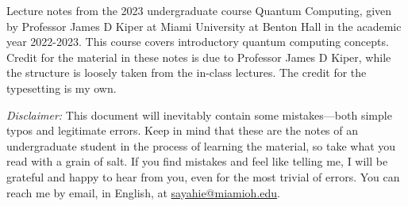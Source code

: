 Lecture notes from the 2023 undergraduate course Quantum Computing, given by Professor James D Kiper at Miami University at Benton Hall in the academic year 2022-2023. This course covers introductory quantum computing concepts. Credit for the material in these notes is due to Professor James D Kiper, while the structure is loosely taken from the in-class lectures. The credit for the typesetting is my own.

\textit{Disclaimer:} This document will inevitably contain some mistakes---both simple typos and legitimate errors. Keep in mind that these are the notes of an undergraduate student in the process of learning the material, so take what you read with a grain of salt. If you find mistakes and feel like telling me, I will be grateful and happy to hear from you, even for the most trivial of errors. You can reach me by email, in English, at \href{mailto:sayahie@miamioh.edu}{sayahie@miamioh.edu}.